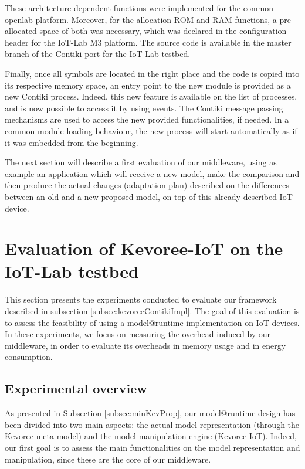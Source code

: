 These architecture-dependent functions were implemented for the common openlab platform.
Moreover, for the allocation ROM and RAM functions, a pre-allocated space of both was necessary, which was declared in the configuration header for the IoT-Lab M3 platform.
The source code is available in the master branch of the Contiki port for the IoT-Lab testbed.

Finally, once all symbols are located in the right place and the code is copied into its respective memory space, an entry point to the new module is provided as a new Contiki process.
Indeed, this new feature is available on the list of processes, and is now possible to access it by using events.
The Contiki message passing mechanisms are used to access the new provided functionalities, if needed.
In a common module loading behaviour, the new process will start automatically as if it was embedded from the beginning.

The next section will describe a first evaluation of our middleware, using as example an application which will receive a new model, make the comparison and then produce the actual changes (adaptation plan) described on the differences between an old and a new proposed model, on top of this already described IoT device.

\section{Evaluation of Kevoree-IoT on the IoT-Lab testbed}
This section presents the experiments conducted to evaluate our framework described in subsection \ref{subsec:kevoreeContikiImpl}.
The goal of this evaluation is to assess the feasibility of using a model@runtime implementation on IoT devices.
In these experiments, we focus on measuring the overhead induced by our middleware, in order to evaluate its overheads in memory usage and in energy consumption.

\subsection{Experimental overview}
As presented in Subsection \ref{subsec:minKevProp}, our model@runtime design has been divided into two main aspects: the actual model representation (through the Kevoree meta-model) and the model manipulation engine (Kevoree-IoT).
Indeed, our first goal is to assess the main functionalities on the model representation and manipulation, since these are the core of our middleware.


